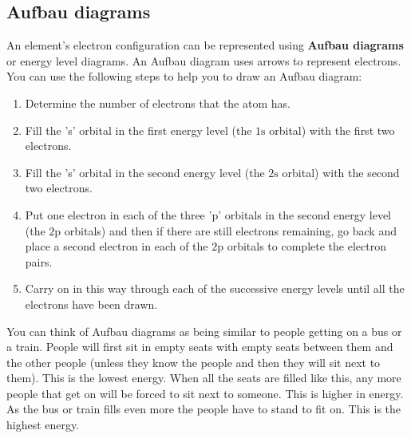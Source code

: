 \subsection*{Aufbau diagrams}        
\label{m38741*id259628}An element's electron configuration can be represented using \textbf{Aufbau diagrams} or energy level diagrams. An Aufbau diagram uses arrows to represent electrons. You can use the following steps to help you to draw an Aufbau diagram:\par 
        \label{m38741*id259639}\begin{enumerate}[noitemsep, label=\textbf{\arabic*}. ] 
            \label{m38741*uid96}\item Determine the number of electrons that the atom has.
\label{m38741*uid97}\item Fill the 's' orbital in the first energy level (the $1\text{s}$ orbital) with the first two electrons.
\label{m38741*uid98}\item Fill the 's' orbital in the second energy level (the $2\text{s}$ orbital) with the second two electrons.
\label{m38741*uid99}\item Put one electron in each of the three 'p' orbitals in the second energy level (the $2\text{p}$ orbitals) and then if there are still electrons remaining, go back and place a second electron in each of the $2\text{p}$ orbitals to complete the electron pairs.
\label{m38741*uid100}\item Carry on in this way through each of the successive energy levels until all the electrons have been drawn.
\end{enumerate}

        

\label{m38741*eip-873}You can think of Aufbau diagrams as being similar to people getting on a bus or a train. People will first sit in empty seats with empty seats between them and the other people (unless they know the people and then they will sit next to them). This is the lowest energy. When all the seats are filled like this, any more people that get on will be forced to sit next to someone. This is higher in energy. As the bus or train fills even more the people have to stand to fit on. This is the highest energy. \par \label{m38741*id259728}
